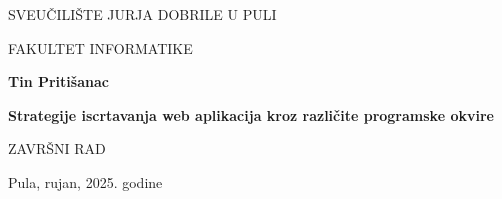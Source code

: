 \begin{center}
SVEUČILIŠTE JURJA DOBRILE U PULI 

FAKULTET INFORMATIKE

\vspace{45mm} 

\textbf{Tin Pritišanac}

\vspace{20mm} 

\textbf{Strategije iscrtavanja web aplikacija
    kroz različite programske okvire}

\vspace{5mm}
ZAVRŠNI RAD

\vfill

Pula, rujan, 2025. godine
\end{center}
